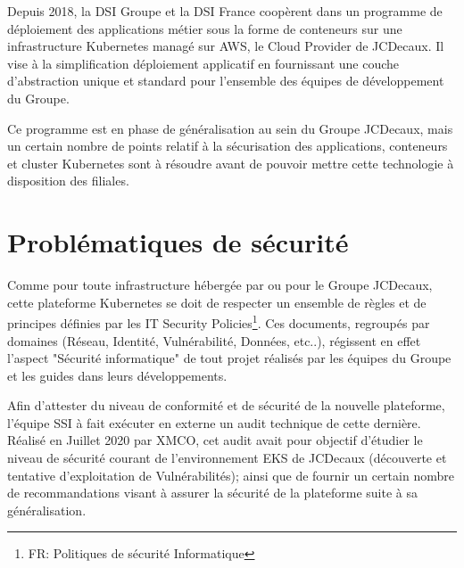 Depuis 2018, la \ac{DSI} Groupe et la \ac{DSI} France coopèrent dans un programme de déploiement des applications métier sous la forme
de conteneurs sur une infrastructure Kubernetes managé sur \ac{AWS}, le Cloud Provider de JCDecaux. Il vise à la simplification
déploiement applicatif en fournissant une couche d'abstraction unique et standard pour l'ensemble des équipes de développement du Groupe.

Ce programme est en phase de généralisation au sein du Groupe JCDecaux, mais un certain nombre de points relatif à la sécurisation des
applications, conteneurs et cluster Kubernetes sont à résoudre avant de pouvoir mettre cette technologie à disposition des filiales.

\section{Problématiques de sécurité}
Comme pour toute infrastructure hébergée par ou pour le Groupe JCDecaux, cette plateforme Kubernetes se doit de respecter un ensemble de 
règles et de principes définies par les IT Security Policies\footnote{FR: Politiques de sécurité Informatique}. Ces documents, 
regroupés par domaines (Réseau, Identité, Vulnérabilité, Données, etc..), régissent en effet l'aspect "Sécurité informatique" de tout projet
réalisés par les équipes du Groupe et les guides dans leurs développements.

Afin d'attester du niveau de conformité et de sécurité de la nouvelle plateforme, l'équipe \ac{SSI} à fait exécuter en externe un audit 
technique de cette dernière. Réalisé en Juillet 2020 par XMCO, cet audit avait pour objectif d'étudier le niveau de sécurité courant de 
l'environnement \ac{EKS} de JCDecaux (découverte et tentative d'exploitation de Vulnérabilités); ainsi que de fournir un certain nombre 
de recommandations visant à assurer la sécurité de la plateforme suite à sa généralisation.

